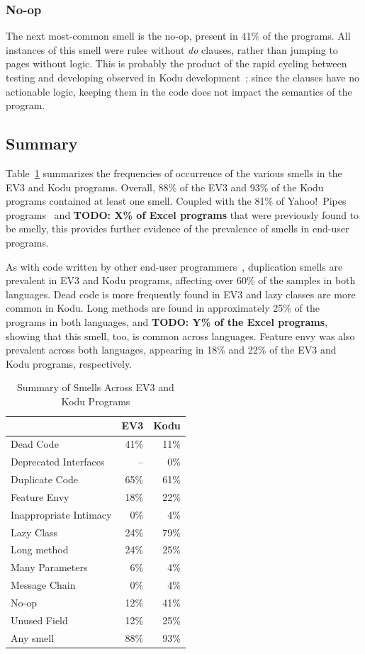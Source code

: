 \documentclass{sig-alternate}
\newcommand{\todo}[1]{\textbf{TODO: #1}}
\begin{document}
\subsubsection{No-op}
The next most-common smell is the no-op, present in 41\% of the programs. All instances of this smell were rules without \emph{do} clauses, rather than jumping to pages without logic. This is probably the product of the rapid cycling between testing and developing observed in Kodu development~\cite{Stolee:2011:ECS:1953163.1953197}; since the clauses have no actionable logic, keeping them in the code does not impact the semantics of the program. 

\subsection{Summary}
Table~\ref{tab:smellsummary} summarizes the frequencies of occurrence of the various smells in the  EV3 and Kodu programs. Overall, 88\% of the EV3 and 93\% of the Kodu programs contained at least one smell. Coupled with the 81\% of Yahoo!\ Pipes programs~\cite{StoleeTSE2013} and \todo{X\% of Excel programs} that were previously found to be smelly, this provides further evidence of the prevalence of smells in end-user programs. 

As with code written by other end-user programmers~\cite{StoleeTSE2013}, duplication smells are prevalent in EV3 and Kodu programs, affecting over 60\% of the samples in both languages. Dead code is more frequently found in EV3 and lazy classes are more common in Kodu. Long methods are found in approximately 25\% of the programs in both languages, and \todo{Y\% of the Excel programs}, showing that this smell, too, is common across languages. Feature envy was also prevalent across both languages, appearing in 18\% and 22\% of the EV3 and Kodu programs, respectively. 


\begin{table}
\caption{Summary of Smells Across EV3 and Kodu Programs \label{tab:smellsummary}}
\begin{center}
\begin{tabular}{l | r r}
&EV3&Kodu\\ \hline
Dead Code&41\%&11\%\\
Deprecated Interfaces & -- & 0\%\\
Duplicate Code&65\%&61\%\\
Feature Envy&18\%&22\%\\
Inappropriate Intimacy&0\%&4\%\\
Lazy Class&24\%&79\%\\
Long method&24\%&25\%\\
Many Parameters&6\%&4\%\\
Message Chain&0\%&4\%\\
No-op&12\%&41\%\\
Unused Field&12\%&25\%\\ \hline
Any smell & 88\% & 93\%
\end{tabular}
\end{center}
\end{table}
\end{document}
